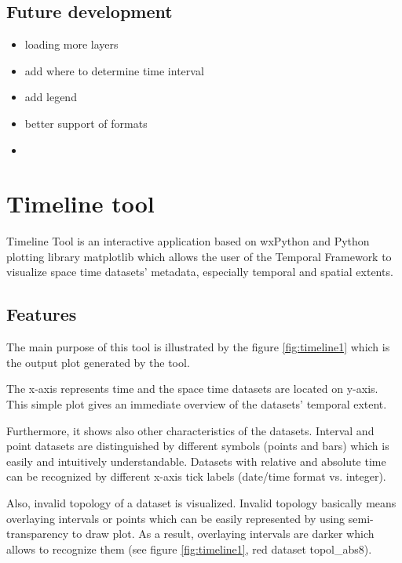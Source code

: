 \documentclass[a4paper,12pt]{book}
\newcommand{\tf}{Temporal Framework\xspace}
\begin{document}
\subsection{Future development}
\begin{itemize}
  \item loading more layers
  \item add where to determine time interval
  \item add legend
  \item better support of formats
  \item 
\end{itemize}



\section{Timeline tool}
Timeline Tool is an interactive application based on wxPython and Python plotting library matplotlib \cite{matplotlib} which allows
the user of the \tf to visualize space time datasets' metadata, especially temporal and spatial extents.

\subsection{Features}
The main purpose of this tool is illustrated by the figure \ref{fig:timeline1}
which is the output plot generated by the tool.

The x-axis represents time and the space time datasets are located on y-axis.
This simple plot gives an immediate overview of the datasets' temporal extent.

Furthermore, it shows also other characteristics of the datasets.
Interval and point datasets are distinguished by different symbols (points and bars)
which is easily and intuitively understandable.
Datasets with relative and absolute time can be recognized by different x-axis tick labels (date/time format vs. integer).

Also, invalid topology of a dataset is visualized.
Invalid topology basically means overlaying intervals or points
which can be easily represented by using semi-transparency to draw plot.
As a result, overlaying intervals are darker
which allows to recognize them (see figure \ref{fig:timeline1}, red dataset topol\_abs8).
\end{document}
